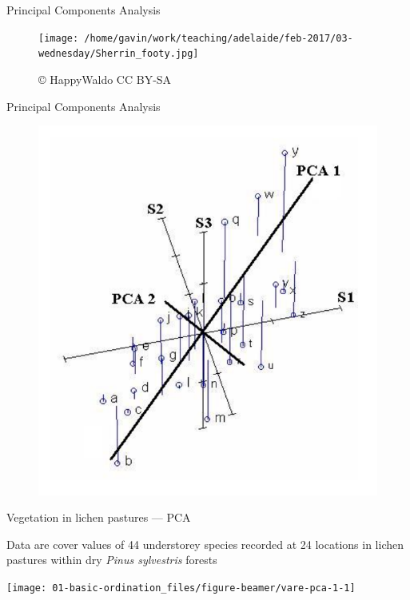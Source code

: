 \documentclass[10pt,ignorenonframetext,compress, aspectratio=169]{beamer}
\begin{document}
\begin{frame}{Principal Components Analysis}

\begin{figure}[htbp]
\centering
\texttt{[image: /home/gavin/work/teaching/adelaide/feb-2017/03-wednesday/Sherrin\_footy.jpg]}
\caption{© HappyWaldo CC BY-SA}
\end{figure}

\end{frame}

\begin{frame}{Principal Components Analysis}

\begin{figure}[htbp]
\centering
\includegraphics{pca_example_figure.pdf}
\caption{}
\end{figure}

\end{frame}

\begin{frame}{Vegetation in lichen pastures --- PCA}

Data are cover values of 44 understorey species recorded at 24 locations
in lichen pastures within dry \emph{Pinus sylvestris} forests

\begin{center}\texttt{[image: 01-basic-ordination\_files/figure-beamer/vare-pca-1-1]} \end{center}

\end{frame}
\end{document}
